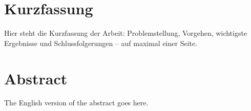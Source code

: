 \chapter*{Kurzfassung}

Hier steht die Kurzfassung der Arbeit: Problemstellung, Vorgehen, wichtigste
Ergebnisse und Schlussfolgerungen -- auf maximal einer Seite.

\chapter*{Abstract}

The English version of the abstract goes here.
